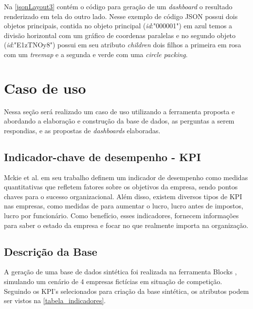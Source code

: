 \documentclass[
	12pt,				%
	openright,			%
	oneside,			%
	a4paper,			%
	english,			%
	brazil				%
	]{abntex2}
\begin{document}
    
Na \autoref{jsonLayout3} contém o código para geração de um \textit{dashboard} o resultado renderizado em tela do outro lado. Nesse exemplo de código JSON possui dois objetos principais, contida no objeto principal (\textit{id}:"000001") em azul temos a divisão horizontal com um gráfico de coordenas paralelas e no segundo objeto (\textit{id}:"E1zTNOy8") possui em seu atributo \textit{children} dois filhos a primeira em rosa com um \textit{treemap} e a segunda e verde com uma \textit{circle packing}.


\chapter{Caso de uso}
\label{ch:base}
Nessa seção será realizado um caso de uso utilizando a ferramenta proposta e abordando a elaboração e construção da base de dados, as perguntas a serem respondias, e as propostas de \textit{dashboards} elaboradas.


\section{Indicador-chave de desempenho - KPI}
Mckie et al. \cite{mckie2009introduction} em seu trabalho definem um indicador de desempenho como medidas quantitativas que refletem fatores sobre os objetivos da empresa, sendo pontos chaves para o sucesso organizacional. Além disso, existem diversos tipos de KPI nas empresas, como medidas de para aumentar o lucro, lucro antes de impostos, lucro por funcionário. Como benefício, esses indicadores, fornecem informações para saber o estado da empresa e focar no que realmente importa na organização.

\section{Descrição da Base}
A geração de uma base de dados sintética foi realizada na ferramenta Blocks \cite{blocks}, simulando um cenário de 4 empresas fictícias em situação de competição. Seguindo os KPI's selecionados para criação da base sintética, os atributos podem ser vistos na \autoref{tabela_indicadores}.
\end{document}

